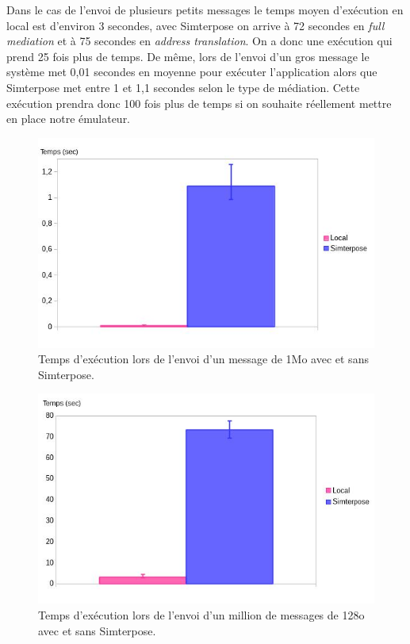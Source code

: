 Dans le cas de l'envoi de plusieurs petits messages le temps moyen d'exécution en local est d'environ 3 secondes, avec Simterpose on arrive à 72 secondes en \textit{full mediation} et à 75 secondes en \textit{address translation}. On a donc une exécution qui prend 25 fois plus de temps. De même, lors de l'envoi d'un gros message le système met 0,01 secondes en moyenne pour exécuter l'application alors que Simterpose met entre 1 et 1,1 secondes selon le type de médiation. Cette exécution prendra donc 100 fois plus de temps si on souhaite réellement mettre en place notre émulateur.

\begin{figure}[H]
  \centering
    \includegraphics[scale=0.5]{mesures/graph/Bigmsg_local.jpg}
    \caption[Temps d'exécution lors de l'envoi d'un message de 1Mo]{Temps d'exécution lors de l'envoi d'un message de 1Mo avec et sans Simterpose.}
    \label{Network_Big_Local}
\end{figure}

\begin{figure}
  \centering
    \includegraphics[scale=0.5]{mesures/graph/Littlemsg_local.jpg}
    \caption[Temps d'exécution lors de l'envoi d'un million de messages de 128o]{Temps d'exécution lors de l'envoi d'un million de messages de 128o avec et sans Simterpose.}
    \label{Network_Little_Local}
\end{figure}
  
